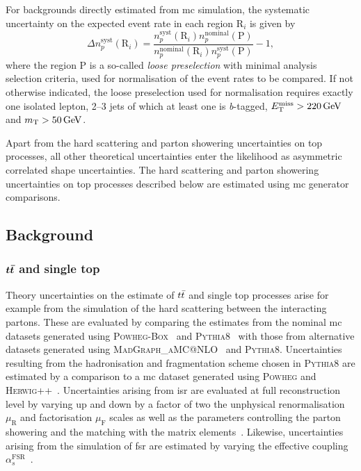  For backgrounds directly estimated from \gls{mc} simulation, the systematic uncertainty on the expected event rate in each region R$_i$ is given by
 \begin{equation}
 	\Delta n_p^\mathrm{syst}(\mathrm{R}_i) = \frac{n_p^\mathrm{syst}(\mathrm{R}_i)n_p^\mathrm{nominal}(\mathrm{P})}{n_p^\mathrm{nominal}(\mathrm{R}_i)n_p^\mathrm{syst}(\mathrm{P})} - 1,
 \end{equation}
 where the region P is a so-called \textit{loose preselection} with minimal analysis selection criteria, used for normalisation of the event rates to be compared.
 If not otherwise indicated, the loose preselection used for normalisation requires exactly one isolated lepton, 2--3 jets of which at least one is \textit{b}-tagged, $\etmiss>\SI{220}{\GeV}$ and $\mt>\SI{50}{\GeV}$.
 
 Apart from the hard scattering and parton showering uncertainties on top processes, all other theoretical uncertainties enter the likelihood as asymmetric correlated shape uncertainties.
 The hard scattering and parton showering uncertainties on top processes described below are estimated using \gls{mc} generator comparisons.
 
 \subsection{Background}
 
 \subsubsection{$\boldsymbol{t\bar{t}}$ and single top}
 
 Theory uncertainties on the estimate of $t\bar{t}$ and single top processes arise for example from the simulation of the hard scattering between the interacting partons.
 These are evaluated by comparing the estimates from the nominal \gls{mc} datasets generated using \textsc{Powheg-Box}~\cite{PowhegBox:2010xd} and \textsc{Pythia8}~\cite{Pythia8:2007gs} with those from alternative datasets generated using \textsc{MadGraph\_aMC@NLO}~\cite{MGaMCNLO:2014hca,Frederix:2012ps} and \textsc{Pythia8}.
 Uncertainties resulting from the hadronisation and fragmentation scheme chosen in \textsc{Pythia8} are estimated by a comparison to a \gls{mc} dataset generated using \textsc{Powheg} and \textsc{Herwig++}~\cite{Herwig:2015jjp}.
 Uncertainties arising from \gls{isr} are evaluated at full reconstruction level by varying up and down by a factor of two the unphysical renormalisation $\mu_\mathrm{R}$ and factorisation $\mu_\mathrm{F}$ scales as well as the parameters controlling the parton showering and the matching with the matrix elements~\cite{ATL-PHYS-PUB-2016-004}.
 Likewise, uncertainties arising from the simulation of \gls{fsr} are estimated by varying the effective coupling $\alpha_s^{\mathrm{FSR}}$~\cite{ATL-PHYS-PUB-2016-004}. 
 
